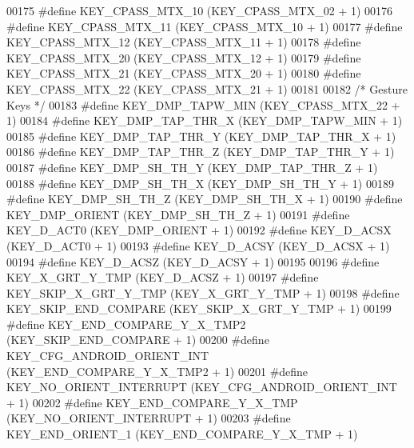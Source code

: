 \begin{DoxyCode}
00175 \textcolor{preprocessor}{#define KEY\_CPASS\_MTX\_10            (KEY\_CPASS\_MTX\_02 + 1)}
00176 \textcolor{preprocessor}{#define KEY\_CPASS\_MTX\_11            (KEY\_CPASS\_MTX\_10 + 1)}
00177 \textcolor{preprocessor}{#define KEY\_CPASS\_MTX\_12            (KEY\_CPASS\_MTX\_11 + 1)}
00178 \textcolor{preprocessor}{#define KEY\_CPASS\_MTX\_20            (KEY\_CPASS\_MTX\_12 + 1)}
00179 \textcolor{preprocessor}{#define KEY\_CPASS\_MTX\_21            (KEY\_CPASS\_MTX\_20 + 1)}
00180 \textcolor{preprocessor}{#define KEY\_CPASS\_MTX\_22            (KEY\_CPASS\_MTX\_21 + 1)}
00181 
00182 \textcolor{comment}{/* Gesture Keys */}
00183 \textcolor{preprocessor}{#define KEY\_DMP\_TAPW\_MIN            (KEY\_CPASS\_MTX\_22 + 1)}
00184 \textcolor{preprocessor}{#define KEY\_DMP\_TAP\_THR\_X           (KEY\_DMP\_TAPW\_MIN + 1)}
00185 \textcolor{preprocessor}{#define KEY\_DMP\_TAP\_THR\_Y           (KEY\_DMP\_TAP\_THR\_X + 1)}
00186 \textcolor{preprocessor}{#define KEY\_DMP\_TAP\_THR\_Z           (KEY\_DMP\_TAP\_THR\_Y + 1)}
00187 \textcolor{preprocessor}{#define KEY\_DMP\_SH\_TH\_Y             (KEY\_DMP\_TAP\_THR\_Z + 1)}
00188 \textcolor{preprocessor}{#define KEY\_DMP\_SH\_TH\_X             (KEY\_DMP\_SH\_TH\_Y + 1)}
00189 \textcolor{preprocessor}{#define KEY\_DMP\_SH\_TH\_Z             (KEY\_DMP\_SH\_TH\_X + 1)}
00190 \textcolor{preprocessor}{#define KEY\_DMP\_ORIENT              (KEY\_DMP\_SH\_TH\_Z + 1)}
00191 \textcolor{preprocessor}{#define KEY\_D\_ACT0                  (KEY\_DMP\_ORIENT + 1)}
00192 \textcolor{preprocessor}{#define KEY\_D\_ACSX                  (KEY\_D\_ACT0 + 1)}
00193 \textcolor{preprocessor}{#define KEY\_D\_ACSY                  (KEY\_D\_ACSX + 1)}
00194 \textcolor{preprocessor}{#define KEY\_D\_ACSZ                  (KEY\_D\_ACSY + 1)}
00195 
00196 \textcolor{preprocessor}{#define KEY\_X\_GRT\_Y\_TMP             (KEY\_D\_ACSZ + 1)}
00197 \textcolor{preprocessor}{#define KEY\_SKIP\_X\_GRT\_Y\_TMP        (KEY\_X\_GRT\_Y\_TMP + 1)}
00198 \textcolor{preprocessor}{#define KEY\_SKIP\_END\_COMPARE        (KEY\_SKIP\_X\_GRT\_Y\_TMP + 1)}
00199 \textcolor{preprocessor}{#define KEY\_END\_COMPARE\_Y\_X\_TMP2    (KEY\_SKIP\_END\_COMPARE + 1)       }
00200 \textcolor{preprocessor}{#define KEY\_CFG\_ANDROID\_ORIENT\_INT  (KEY\_END\_COMPARE\_Y\_X\_TMP2 + 1)}
00201 \textcolor{preprocessor}{#define KEY\_NO\_ORIENT\_INTERRUPT     (KEY\_CFG\_ANDROID\_ORIENT\_INT + 1)}
00202 \textcolor{preprocessor}{#define KEY\_END\_COMPARE\_Y\_X\_TMP     (KEY\_NO\_ORIENT\_INTERRUPT + 1)}
00203 \textcolor{preprocessor}{#define KEY\_END\_ORIENT\_1            (KEY\_END\_COMPARE\_Y\_X\_TMP + 1)}

\end{DoxyCode}
